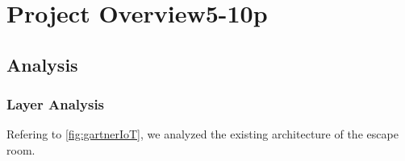 \chapter{Project Overview5-10p} %
\label{Chapter3} %
\section{Analysis}

\subsection{Layer Analysis}
Refering to \ref{fig:gartnerIoT}, we analyzed the existing architecture of the escape room.

